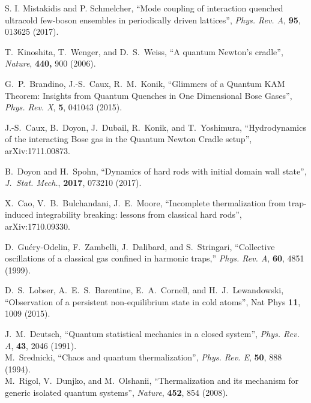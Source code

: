 \documentclass[a4paper, onecolumn]{revtex4-1}
\begin{document}
\begin{thebibliography}{1}
S. I. Mistakidis and P. Schmelcher, 
``Mode coupling of interaction quenched ultracold few-boson ensembles in periodically driven
lattices'', 
{\em Phys. Rev. A}, {\bf 95}, 013625 (2017). 





T.~Kinoshita, T.~Wenger, and D.~S.~Weiss, ``A quantum Newton's cradle'', {\em Nature}, {\bf 440,} 900 (2006). 

G.~P.~Brandino, J.-S.~Caux, R.~M.~Konik,
``Glimmers of a Quantum KAM Theorem: Insights from Quantum Quenches in One Dimensional Bose Gases'', 
{\em Phys. Rev. X}, {\bf 5}, 041043 (2015).  

 J.-S.~Caux, B.~Doyon, J.~Dubail, R.~Konik, and T.~Yoshimura,
  ``Hydrodynamics of the interacting Bose gas in the Quantum Newton Cradle setup'',
  arXiv:1711.00873.

 B.~Doyon and H.~Spohn, ``Dynamics of hard rods with initial domain wall
  state'', {\em J.~Stat. Mech.}, {\bf 2017}, 073210 (2017).

 X.~Cao, V.~B.~Bulchandani, J.~E.~Moore, ``Incomplete thermalization from
  trap-induced integrability breaking: lessons from classical hard rods'', arXiv:1710.09330.


  
D.~Gu\'ery-Odelin, F.~Zambelli, J.~Dalibard, and S.~Stringari, ``Collective
  oscillations of a classical gas confined in harmonic traps,'' {\em Phys. Rev.
  A}, {\bf 60}, 4851 (1999).

 D.~S.~Lobser, A.~E.~S.~Barentine, E.~A.~Cornell, and
  H.~J.~Lewandowski, ``Observation of a persistent non-equilibrium state in cold atoms'', Nat Phys
  {\bf 11}, 1009 (2015).




J.~M.~Deutsch, ``Quantum statistical mechanics in a closed system'', {\em Phys. Rev. A}, {\bf 43}, 2046 (1991).
%
\\
%
M.~Srednicki, ``Chaos and quantum thermalization'', {\em Phys. Rev. E}, {\bf 50}, 888 (1994).
%
\\
%
M.~Rigol, V.~Dunjko, and M.~Olshanii, ``Thermalization and its mechanism for generic isolated
quantum systems'', {\em Nature}, {\bf 452}, 854 (2008).



\end{thebibliography}
\end{document}
